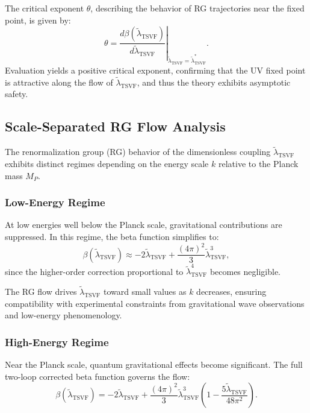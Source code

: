 \documentclass[twocolumn,superscriptaddress,floatfix]{revtex4-2}
\begin{document}
The critical exponent \(\theta\), describing the behavior of RG trajectories near the fixed point, is given by:
\begin{equation}
\theta = \left. \frac{d\beta(\tilde{\lambda}_{\text{TSVF}})}{d\tilde{\lambda}_{\text{TSVF}}} \right|_{\tilde{\lambda}_{\text{TSVF}} = \tilde{\lambda}_{\text{TSVF}}^*}.
\end{equation}
Evaluation yields a positive critical exponent, confirming that the UV fixed point is attractive along the flow of \(\tilde{\lambda}_{\text{TSVF}}\), and thus the theory exhibits asymptotic safety.


\subsection{Scale-Separated RG Flow Analysis}
\label{sec:scaleseparated}

The renormalization group (RG) behavior of the dimensionless coupling \(\tilde{\lambda}_{\text{TSVF}}\) exhibits distinct regimes depending on the energy scale \(k\) relative to the Planck mass \(M_P\).

\subsubsection{\texorpdfstring{Low-Energy Regime}{Low-Energy Regime}}

At low energies well below the Planck scale, gravitational contributions are suppressed. In this regime, the beta function simplifies to:
\begin{equation}
\beta(\tilde{\lambda}_{\text{TSVF}}) \approx -2\tilde{\lambda}_{\text{TSVF}} + \frac{(4\pi)^2}{3} \tilde{\lambda}_{\text{TSVF}}^3,
\end{equation}
since the higher-order correction proportional to \(\tilde{\lambda}_{\text{TSVF}}^4\) becomes negligible.

The RG flow drives \(\tilde{\lambda}_{\text{TSVF}}\) toward small values as \(k\) decreases, ensuring compatibility with experimental constraints from gravitational wave observations and low-energy phenomenology.

\subsubsection{\texorpdfstring{High-Energy Regime}{High-Energy Regime}}

Near the Planck scale, quantum gravitational effects become significant. The full two-loop corrected beta function governs the flow:
\begin{equation}
\beta(\tilde{\lambda}_{\text{TSVF}}) = -2\tilde{\lambda}_{\text{TSVF}} + \frac{(4\pi)^2}{3} \tilde{\lambda}_{\text{TSVF}}^3 \left( 1 - \frac{5\tilde{\lambda}_{\text{TSVF}}}{48\pi^2} \right).
\end{equation}
\end{document}
